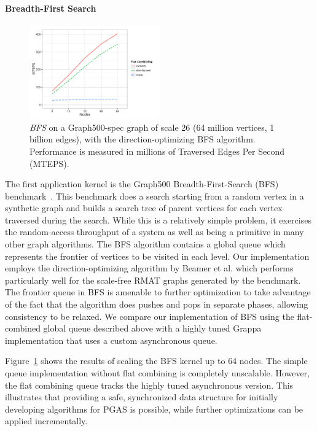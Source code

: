 \paragraph{Breadth-First Search}
\begin{figure}[t]
  \centering
  \includegraphics[width=0.5\textwidth]{data/plots/bfs_perf.pdf}
  \caption{\emph{BFS} on a Graph500-spec graph of scale 26 (64 million vertices, 1 billion edges), with the direction-optimizing BFS algorithm. Performance is measured in millions of Traversed Edges Per Second (MTEPS).}
  \label{fig:bfs_perf}
\end{figure}
The first application kernel is the Graph500 Breadth-First-Search (BFS) benchmark~\cite{graph500list}. This benchmark does a search starting from a random vertex in a synthetic graph and builds a search tree of parent vertices for each vertex traversed during the search. While this is a relatively simple problem, it exercises the random-access throughput of a system as well as being a primitive in many other graph algorithms. The BFS algorithm contains a global queue which represents the frontier of vertices to be visited in each level.
Our implementation employs the direction-optimizing algorithm by Beamer et al.\cite{Beamer:Graph500} which performs particularly well for the scale-free RMAT graphs generated by the benchmark.
The frontier queue in BFS is amenable to further optimization to take advantage of the fact that the algorithm does pushes and pops in separate phases, allowing consistency to be relaxed.
We compare our implementation of BFS using the flat-combined global queue described above with a highly tuned Grappa implementation that uses a custom asynchronous queue.

Figure~\ref{fig:bfs_perf} shows the results of scaling the BFS kernel up to 64 nodes. The simple queue implementation without flat combining is completely unscalable. However, the flat combining queue tracks the highly tuned asynchronous version. This illustrates that providing a safe, synchronized data structure for initially developing algorithms for PGAS is possible, while further optimizations can be applied incrementally.

